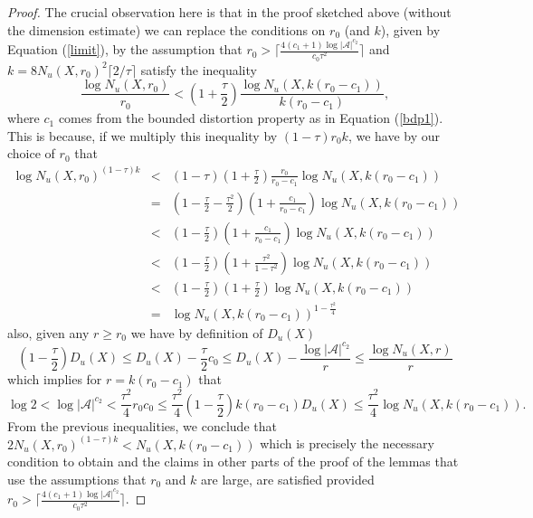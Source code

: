 \documentclass[12pt]{amsart}
\providecommand{\abs}[1]{\lvert#1\rvert}
\theoremstyle{plain} %
\theoremstyle{definition} %
\numberwithin{equation}{section}
\begin{document}
\begin{proof}
The crucial observation here is that in the proof sketched above (without the dimension estimate) we can replace the conditions on $r_0$ (and $k$), given by Equation (\ref{limit}), by the assumption that $r_0>\lceil\frac{4(c_1+1)\log|\mathcal{A}|^{c_2}}{c_0\tau^2}\rceil$ and $k=8  N_u(X,r_0)^2\lceil2/\tau\rceil$ satisfy the inequality
\begin{equation}\label{condition}
\frac{\log N_u(X,r_0)}{r_0} < (1+\frac{\tau}{2})\frac{\log N_u(X,k(r_0-c_1))}{k(r_0-c_1)},
\end{equation}
where $c_1$ comes from the bounded distortion property as in Equation (\ref{bdp1}). This is because, if we multiply this inequality by $(1-\tau)r_0k$, we have by our choice of $r_0$ that 
\begin{eqnarray*}\log N_u(X,r_0)^{(1-\tau)k} &<& (1-\tau)(1+\frac{\tau}{2})\frac{r_0}{r_0-c_1}\log N_u(X,k(r_0-c_1))\\ &=&(1-\frac{\tau}{2}-\frac{\tau^2}{2})(1+ \frac{c_1}{r_0-c_1})\log N_u(X,k(r_0-c_1))\\ &<& (1-\frac{\tau}{2})(1+ \frac{c_1}{r_0-c_1})\log N_u(X,k(r_0-c_1)) \\&<&  (1-\frac{\tau}{2})(1+\frac{\tau^2}{1-\tau^2})\log N_u(X,k(r_0-c_1))\\ &<&  (1-\frac{\tau}{2}) (1+\frac{\tau}{2})\log N_u(X,k(r_0-c_1)) \\ &=&\log N_u(X,k(r_0-c_1))^{1-\frac{\tau^2}{4}}
\end{eqnarray*}
also, given any $r\geq r_0$ we have by definition of $D_u(X)$
\begin{equation}\label{dime}
(1-\frac{\tau}{2})D_u(X)\leq D_u(X)-\frac{\tau}{2}c_0\leq D_u(X)-\frac{\log\abs{\mathcal{A}}^{c_2}}{r}\leq \frac{\log N_u(X,r)}{r} 
\end{equation}
which implies for $r=k(r_0-c_1)$ that
$$\log2<\log\abs{\mathcal{A}}^{c_2}< \frac{\tau^2}{4}r_0c_0 \leq\frac{\tau^2}{4}(1-\frac{\tau}{2})k(r_0-c_1)D_u(X)\leq\frac{\tau^2}{4}\log N_u(X,k(r_0-c_1)).$$
From the previous inequalities, we conclude that $2N_u(X,r_0)^{(1-\tau)k}<N_u(X,k(r_0-c_1))$ which is precisely the necessary condition to obtain \cite[Equation 2.4, Lemma 2.13]{CMM16} and the claims in other parts of the proof of the lemmas that use the assumptions that $r_0$ and $k$ are large, are satisfied provided $r_0> \lceil\frac{4(c_1+1)\log|\mathcal{A}|^{c_2}}{c_0\tau^2}\rceil$.


\end{proof}
\end{document}
